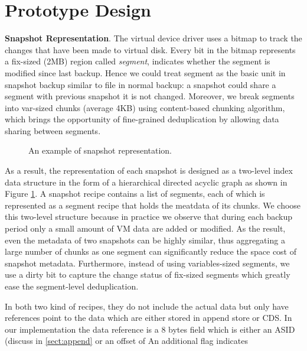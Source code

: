 \section{Prototype Design}


 
{\bf Snapshot Representation}.
The virtual device driver uses a bitmap to track the changes 
that have been made to virtual disk.
Every bit in the bitmap represents a fix-sized (2MB) region called \textit{segment}, indicates whether the segment
is modified since last backup. Hence we could treat segment as the basic unit in snapshot backup similar to
file in normal backup: a snapshot could share a segment with previous snapshot it is not changed. 
Moreover, we break 
segments into var-sized chunks (average 4KB) using content-based chunking algorithm,
which brings the opportunity of fine-grained deduplication by
allowing data sharing between segments.

\begin{figure}[htbp]
  \centering
  \caption{An example of snapshot representation.}
  \label{fig:snapshot}
\end{figure}
As a result, the representation of each snapshot is designed as a two-level index data structure 
in the form of a hierarchical directed acyclic graph as shown in Figure \ref{fig:snapshot}.
A snapshot recipe contains a list of segments, each of which is represented as a segment recipe
that holds the meatdata of its chunks. We choose this two-level structure because in practice we
observe that during each backup period only a small amount of VM data are added or modified. 
As the result, even the metadata of two snapshots can be highly similar, 
thus aggregating a large number of chunks as one segment can significantly reduce the space cost of snapshot metadata.
Furthermore, instead of using variables-sized segments, we use a dirty bit to capture the change status of fix-sized
segments which greatly ease the segment-level deduplication.

In both two kind of recipes, 
they do not include the actual data but only have
 references point to the data which are either stored in append store or CDS.
In our implementation the data reference is a 8 bytes field which is either an 
ASID (discuss in \ref{sect:append} or an offset of 
An additional flag indicates



